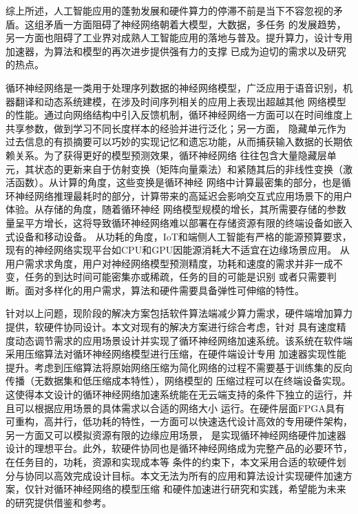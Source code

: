 综上所述，人工智能应用的蓬勃发展和硬件算力的停滞不前是当下不容忽视的矛盾。这组矛盾一方面阻碍了神经网络朝着大模型，大数据，多任务
的发展趋势，另一方面也阻碍了工业界对成熟人工智能应用的落地与普及。提升算力，设计专用加速器，为算法和模型的再次进步提供强有力的支撑
已成为迫切的需求以及研究的热点。

循环神经网络是一类用于处理序列数据的神经网络模型，广泛应用于语音识别，机器翻译和动态系统建模，在涉及时间序列相关的应用上表现出超越其他
网络模型的性能。通过向网络结构中引入反馈机制，循环神经网络一方面可以在时间维度上共享参数，做到学习不同长度样本的经验并进行泛化；另一方面，
隐藏单元作为过去信息的有损摘要可以巧妙的实现记忆和遗忘功能，从而捕获输入数据的长期依赖关系。为了获得更好的模型预测效果，循环神经网络
往往包含大量隐藏层单元，其状态的更新来自于仿射变换（矩阵向量乘法）和紧随其后的非线性变换（激活函数）。从计算的角度，这些变换是循环神经
网络中计算最密集的部分，也是循环神经网络推理最耗时的部分，计算带来的高延迟会影响交互式应用场景下的用户体验。从存储的角度，随着循环神经
网络模型规模的增长，其所需要存储的参数量呈平方增长，这将导致循环神经网络难以部署在存储资源有限的终端设备如嵌入式设备和移动设备。
从功耗的角度，IoT和端侧人工智能有严格的能源预算要求，现有的神经网络实现平台如CPU和GPU因能源消耗大不适宜在边缘场景应用。
从用户需求求角度，用户对神经网络模型预测精度，功耗和速度的需求并非一成不变，任务的到达时间可能密集亦或稀疏，任务的目的可能是识别
或者只需要判断。面对多样化的用户需求，算法和硬件需要具备弹性可伸缩的特性。

针对以上问题，现阶段的解决方案包括软件算法端减少算力需求，硬件端增加算力提供，软硬件协同设计。本文对现有的解决方案进行综合考虑，针对
具有速度精度动态调节需求的应用场景设计并实现了循环神经网络加速系统。该系统在软件端采用压缩算法对循环神经网络模型进行压缩，在硬件端设计专用
加速器实现性能提升。考虑到压缩算法将原始网络压缩为简化网络的过程不需要基于训练集的反向传播（无数据集和低压缩成本特性），网络模型的
压缩过程可以在终端设备实现。这使得本文设计的循环神经网络加速系统能在无云端支持的条件下独立的运行，并且可以根据应用场景的具体需求以合适的网络大小
运行。在硬件层面FPGA具有可重构，高并行，低功耗的特性，一方面可以快速迭代设计高效的专用硬件架构，另一方面又可以模拟资源有限的边缘应用场景，
是实现循环神经网络硬件加速器设计的理想平台。此外，软硬件协同也是循环神经网络成为完整产品的必要环节，在任务目的，功耗，资源和实现成本等
条件的约束下，本文采用合适的软硬件划分与协同以高效完成设计目标。本文无法为所有的应用和算法设计实现硬件加速方案，仅针对循环神经网络的模型压缩
和硬件加速进行研究和实践，希望能为未来的研究提供借鉴和参考。

